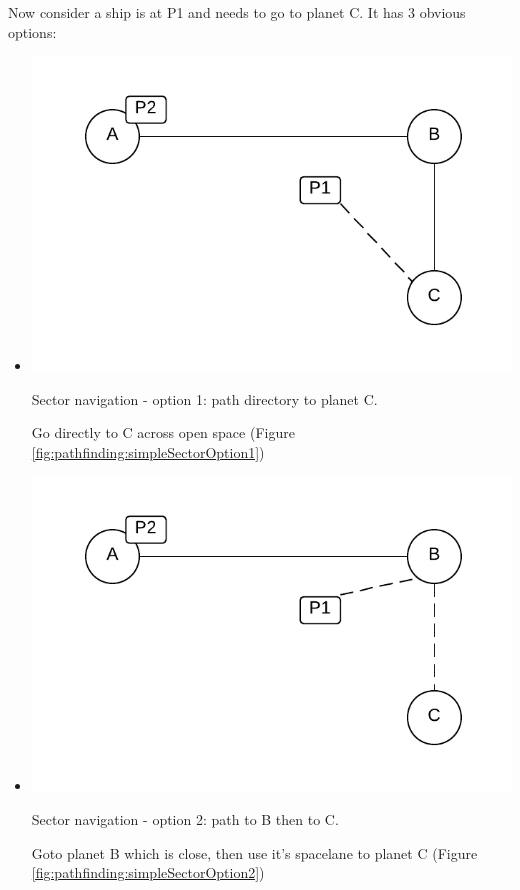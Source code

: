 Now consider a ship is at P1 and needs to go to planet C.
It has 3 obvious options:
\begin{itemize}
\item 
\begin{marginfigure}
	\includegraphics{res/pathfinding/PathFindingSectorOption1.pdf}
    \caption[Sector navigation - option 1: path directory to planet C]{Sector navigation - option 1: path directory to planet C.}
	\label{fig:pathfinding:simpleSectorOption1}
\end{marginfigure}
Go directly to C across open space (Figure \ref{fig:pathfinding:simpleSectorOption1})

\item 
\begin{marginfigure}
	\includegraphics{res/pathfinding/PathFindingSectorOption2.pdf}
    \caption[Sector navigation - option 2: path to B then to C]{Sector navigation - option 2: path to B then to C.}
	\label{fig:pathfinding:simpleSectorOption2}
\end{marginfigure}
Goto planet B which is close, then use it's spacelane to planet C (Figure \ref{fig:pathfinding:simpleSectorOption2})


\end{itemize}
